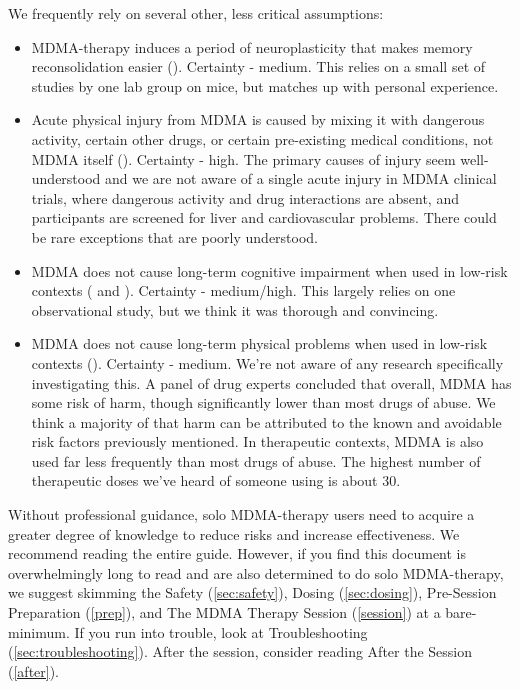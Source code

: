 \documentclass[12pt,letterpaper]{article}
\begin{document}
We frequently rely on several other, less critical assumptions:
\begin{itemize}
	\item MDMA-therapy induces a period of neuroplasticity that makes memory reconsolidation easier (\textcite{nardouMDMAPlasticity}). Certainty - medium. This relies on a small set of studies by one lab group on mice, but matches up with personal experience.
	\item Acute physical injury from MDMA is caused by mixing it with dangerous activity, certain other drugs, or certain pre-existing medical conditions, not MDMA itself (\textcite{riggDeaths}). Certainty - high. The primary causes of injury seem well-understood and we are not aware of a single acute injury in MDMA clinical trials, where dangerous activity and drug interactions are absent, and participants are screened for liver and cardiovascular problems. There could be rare exceptions that are poorly understood.
	\item MDMA does not cause long-term cognitive impairment when used in low-risk contexts (\textcite{halpernMormonRavers} and \textcite{passieHistory}). Certainty - medium/high. This largely relies on one observational study, but we think it was thorough and convincing.
	\item MDMA does not cause long-term physical problems when used in low-risk contexts (\textcite{nuttDrugHarms}). Certainty - medium. We're not aware of any research specifically investigating this. A panel of drug experts concluded that overall, MDMA has some risk of harm, though significantly lower than most drugs of abuse. We think a majority of that harm can be attributed to the known and avoidable risk factors previously mentioned. In therapeutic contexts, MDMA is also used far less frequently than most drugs of abuse. The highest number of therapeutic doses we've heard of someone using is about 30.
\end{itemize}

Without professional guidance, solo MDMA-therapy users need to acquire a greater degree of knowledge to reduce risks and increase effectiveness. We recommend reading the entire guide. However, if you find this document is overwhelmingly long to read and are also determined to do solo MDMA-therapy, we suggest skimming the Safety (\ref{sec:safety}), Dosing (\ref{sec:dosing}), Pre-Session Preparation (\ref{prep}), and The MDMA Therapy Session (\ref{session}) at a bare-minimum. If you run into trouble, look at Troubleshooting (\ref{sec:troubleshooting}). After the session, consider reading After the Session (\ref{after}).
\end{document}
